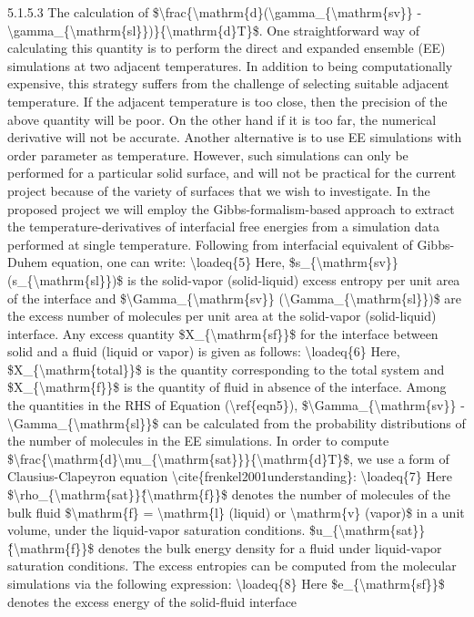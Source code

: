 \par 5.1.5.3 The calculation of \$\textbackslash frac\{\textbackslash mathrm\{d\}(\textbackslash gamma\_\{\textbackslash mathrm\{sv\}\} - \textbackslash gamma\_\{\textbackslash mathrm\{sl\}\})\}\{\textbackslash mathrm\{d\}T\}\$. One straightforward way of calculating this quantity is to perform the direct and expanded ensemble (EE) simulations at two adjacent temperatures. In addition to being computationally expensive, this strategy suffers from the challenge of selecting suitable adjacent temperature. If the adjacent temperature is too close, then the precision of the above quantity will be poor. On the other hand if it is too far, the numerical derivative will not be accurate. Another alternative is to use EE simulations with order parameter as temperature. However, such simulations can only be performed for a particular solid surface, and will not be practical for the current project because of the variety of surfaces that we wish to investigate. In the proposed project we will employ the Gibbs-formalism-based approach to extract the temperature-derivatives of interfacial free energies from a simulation data performed at single temperature. Following from interfacial equivalent of Gibbs-Duhem equation, one can write: \textbackslash loadeq\{5\} Here, \$s\_\{\textbackslash mathrm\{sv\}\} (s\_\{\textbackslash mathrm\{sl\}\})\$ is the solid-vapor (solid-liquid) excess entropy per unit area of the interface and \$\textbackslash Gamma\_\{\textbackslash mathrm\{sv\}\} (\textbackslash Gamma\_\{\textbackslash mathrm\{sl\}\})\$ are the excess number of molecules per unit area at the solid-vapor (solid-liquid) interface. Any excess quantity \$X\_\{\textbackslash mathrm\{sf\}\}\$ for the interface between solid and a fluid (liquid or vapor) is given as follows: \textbackslash loadeq\{6\} Here, \$X\_\{\textbackslash mathrm\{total\}\}\$ is the quantity corresponding to the total system and \$X\_\{\textbackslash mathrm\{f\}\}\$ is the quantity of fluid in absence of the interface. Among the quantities in the RHS of Equation (\textbackslash ref\{eqn5\}), \$\textbackslash Gamma\_\{\textbackslash mathrm\{sv\}\} - \textbackslash Gamma\_\{\textbackslash mathrm\{sl\}\}\$ can be calculated from the probability distributions of the number of molecules in the EE simulations. In order to compute \$\textbackslash frac\{\textbackslash mathrm\{d\}\textbackslash mu\_\{\textbackslash mathrm\{sat\}\}\}\{\textbackslash mathrm\{d\}T\}\$, we use a form of Clausius-Clapeyron equation \textbackslash cite\{frenkel2001understanding\}: \textbackslash loadeq\{7\} Here \$\textbackslash rho\_\{\textbackslash mathrm\{sat\}\}\^\{\textbackslash mathrm\{f\}\}\$ denotes the number of molecules of the bulk fluid \$\textbackslash mathrm\{f\}  = \textbackslash mathrm\{l\} (liquid) or \textbackslash mathrm\{v\} (vapor)\$ in a unit volume, under the liquid-vapor saturation conditions. \$u\_\{\textbackslash mathrm\{sat\}\}\^\{\textbackslash mathrm\{f\}\}\$ denotes the bulk energy density for a fluid under liquid-vapor saturation conditions. The excess entropies can be computed from the molecular simulations via the following expression: \textbackslash loadeq\{8\} Here \$e\_\{\textbackslash mathrm\{sf\}\}\$ denotes the excess energy of the solid-fluid interface 